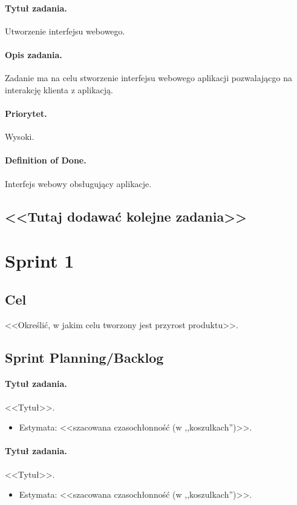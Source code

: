 \documentclass[a4paper]{article}
\begin{document}
\paragraph{Tytuł zadania.} Utworzenie interfejsu webowego.
\paragraph{Opis zadania.} Zadanie ma na celu stworzenie interfejsu webowego aplikacji pozwalającgo na interakcję klienta z aplikacją.
\paragraph{Priorytet.} Wysoki.
\paragraph{Definition of Done.} Interfejs webowy obsługujący aplikacje.

\subsection*{<<Tutaj dodawać kolejne zadania>>}

\section{Sprint 1}
\subsection{Cel} <<Określić, w jakim celu tworzony jest przyrost produktu>>.
\subsection{Sprint Planning/Backlog}

\paragraph{Tytuł zadania.} <<Tytuł>>.
\begin{itemize}
\item Estymata: <<szacowana czasochłonność (w ,,koszulkach'')>>.
\end{itemize}

\paragraph{Tytuł zadania.} <<Tytuł>>.
\begin{itemize}
\item Estymata: <<szacowana czasochłonność (w ,,koszulkach'')>>.
\end{itemize}
\end{document}
